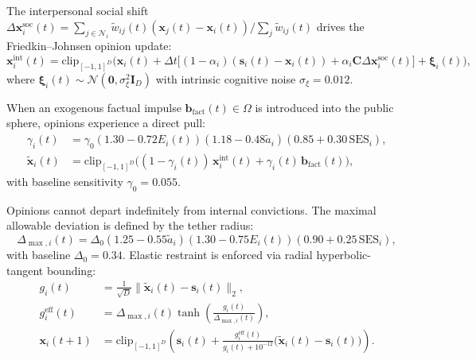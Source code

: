 \documentclass[11pt,a4paper]{article}
\begin{document}
The interpersonal social shift $\Delta \mathbf{x}_i^{\mathrm{soc}}(t) = \sum_{j \in \mathcal{N}_i} \tilde{w}_{ij}(t)(\mathbf{x}_j(t) - \mathbf{x}_i(t)) / \sum_{j} \tilde{w}_{ij}(t)$ drives the Friedkin--Johnsen opinion update:
\begin{equation}
    \mathbf{x}_i^{\mathrm{int}}(t) = \mathrm{clip}_{[-1, 1]^D}\!\Big(\mathbf{x}_i(t) + \Delta t \big[(1 - \alpha_i)(\mathbf{s}_i(t) - \mathbf{x}_i(t)) + \alpha_i \mathbf{C}\Delta \mathbf{x}_i^{\mathrm{soc}}(t)\big] + \boldsymbol{\xi}_i(t)\Big),
    \label{eq:fj_opinion_update}
\end{equation}
where $\boldsymbol{\xi}_i(t) \sim \mathcal{N}(\mathbf{0}, \sigma_{\xi}^2 \mathbf{I}_D)$ with intrinsic cognitive noise $\sigma_{\xi} = 0.012$.

When an exogenous factual impulse $\mathbf{b}_{\mathrm{fact}}(t) \in \Omega$ is introduced into the public sphere, opinions experience a direct pull:
\begin{align}
    \gamma_i(t) &= \gamma_0 (1.30 - 0.72 E_i(t)) (1.18 - 0.48\tilde{a}_i) (0.85 + 0.30\,\mathrm{SES}_i), \label{eq:fact_pull_sensitivity} \\
    \tilde{\mathbf{x}}_i(t) &= \mathrm{clip}_{[-1, 1]^D}\!\big((1 - \gamma_i(t))\,\mathbf{x}_i^{\mathrm{int}}(t) + \gamma_i(t)\,\mathbf{b}_{\mathrm{fact}}(t)\big), \label{eq:fact_pulled_opinion}
\end{align}
with baseline sensitivity $\gamma_0 = 0.055$.

Opinions cannot depart indefinitely from internal convictions. The maximal allowable deviation is defined by the tether radius:
\begin{equation}
    \Delta_{\max, i}(t) = \Delta_0 (1.25 - 0.55\tilde{a}_i)(1.30 - 0.75 E_i(t))(0.90 + 0.25\,\mathrm{SES}_i),
    \label{eq:tether_radius}
\end{equation}
with baseline $\Delta_0 = 0.34$. Elastic restraint is enforced via radial hyperbolic-tangent bounding:
\begin{align}
    g_i(t) &= \frac{1}{\sqrt{D}}\|\tilde{\mathbf{x}}_i(t) - \mathbf{s}_i(t)\|_2, \label{eq:raw_deviation} \\
    g_i^{\mathrm{eff}}(t) &= \Delta_{\max, i}(t) \tanh\!\left(\frac{g_i(t)}{\Delta_{\max, i}(t)}\right), \label{eq:effective_deviation} \\
    \mathbf{x}_i(t+1) &= \mathrm{clip}_{[-1, 1]^D}\!\left(\mathbf{s}_i(t) + \frac{g_i^{\mathrm{eff}}(t)}{g_i(t) + 10^{-12}}\big(\tilde{\mathbf{x}}_i(t) - \mathbf{s}_i(t)\big)\right). \label{eq:final_opinion_tethered}
\end{align}
\end{document}
